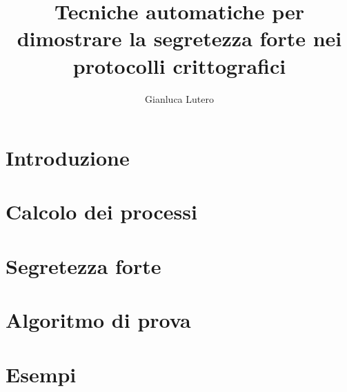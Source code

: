 \documentclass[12pt]{report}
\title{Tecniche automatiche per dimostrare la segretezza forte nei protocolli crittografici}
\author{Gianluca Lutero}
\begin{document}
\maketitle
\newpage
\tableofcontents

\newpage
{}
\section*{Introduzione}
\section*{Calcolo dei processi}
\section*{Segretezza forte}
\section*{Algoritmo di prova}
\section*{Esempi}
\end{document}

